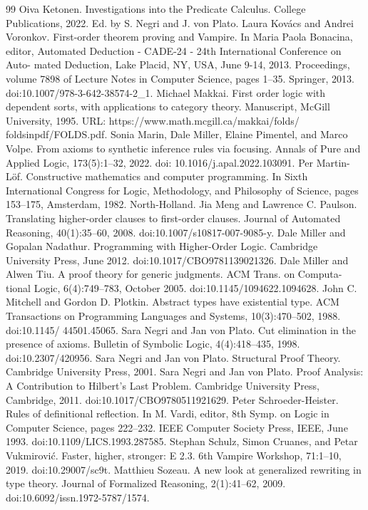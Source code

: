 \begin{thebibliography}{99}
 Oiva Ketonen. Investigations into the Predicate Calculus. College Publications, 2022. Ed. by S. Negri and J. von Plato.
 Laura Kovács and Andrei Voronkov. First-order theorem proving and Vampire. In Maria Paola Bonacina, editor, Automated Deduction - CADE-24 - 24th International Conference on Auto- mated Deduction, Lake Placid, NY, USA, June 9-14, 2013. Proceedings, volume 7898 of Lecture Notes in Computer Science, pages 1–35. Springer, 2013. doi:10.1007/978-3-642-38574-2\_1.
 Michael Makkai. First order logic with dependent sorts, with applications to category theory. Manuscript, McGill University, 1995. URL: https://www.math.mcgill.ca/makkai/folds/ foldsinpdf/FOLDS.pdf.
 Sonia Marin, Dale Miller, Elaine Pimentel, and Marco Volpe. From axioms to synthetic inference rules via focusing. Annals of Pure and Applied Logic, 173(5):1–32, 2022. doi: 10.1016/j.apal.2022.103091.
 Per Martin-Löf. Constructive mathematics and computer programming. In Sixth International Congress for Logic, Methodology, and Philosophy of Science, pages 153–175, Amsterdam, 1982. North-Holland.
 Jia Meng and Lawrence C. Paulson. Translating higher-order clauses to first-order clauses. Journal of Automated Reasoning, 40(1):35–60, 2008. doi:10.1007/s10817-007-9085-y.
 Dale Miller and Gopalan Nadathur. Programming with Higher-Order Logic. Cambridge University Press, June 2012. doi:10.1017/CBO9781139021326.
 Dale Miller and Alwen Tiu. A proof theory for generic judgments. ACM Trans. on Computa- tional Logic, 6(4):749–783, October 2005. doi:10.1145/1094622.1094628.
 John C. Mitchell and Gordon D. Plotkin. Abstract types have existential type. ACM Transactions on Programming Languages and Systems, 10(3):470–502, 1988. doi:10.1145/ 44501.45065.
 Sara Negri and Jan von Plato. Cut elimination in the presence of axioms. Bulletin of Symbolic Logic, 4(4):418–435, 1998. doi:10.2307/420956.
 Sara Negri and Jan von Plato. Structural Proof Theory. Cambridge University Press, 2001.
 Sara Negri and Jan von Plato. Proof Analysis: A Contribution to Hilbert’s Last Problem. Cambridge University Press, Cambridge, 2011. doi:10.1017/CBO9780511921629.
 Peter Schroeder-Heister. Rules of definitional reflection. In M. Vardi, editor, 8th Symp. on Logic in Computer Science, pages 222–232. IEEE Computer Society Press, IEEE, June 1993. doi:10.1109/LICS.1993.287585.
 Stephan Schulz, Simon Cruanes, and Petar Vukmirović. Faster, higher, stronger: E 2.3. 6th Vampire Workshop, 71:1–10, 2019. doi:10.29007/sc9t.
 Matthieu Sozeau. A new look at generalized rewriting in type theory. Journal of Formalized Reasoning, 2(1):41–62, 2009. doi:10.6092/issn.1972-5787/1574.
\end{thebibliography}
